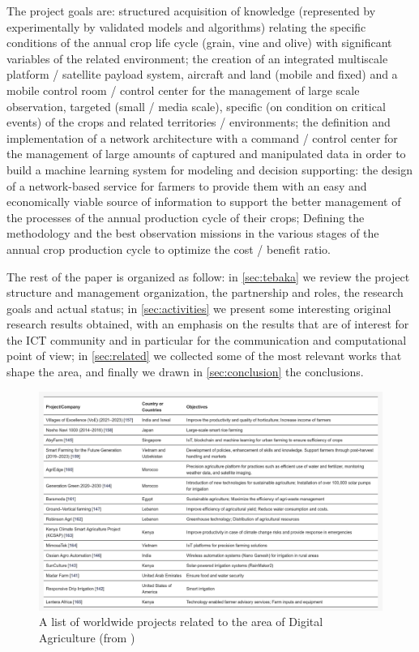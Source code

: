 \documentclass[a4paper, comsoc]{IEEEtran}
\begin{document}
The project goals are: structured acquisition of knowledge (represented by experimentally by validated models and algorithms) relating the specific conditions of the annual crop life cycle (grain, vine and olive) with significant variables of the related environment;
the creation of an integrated multiscale platform / satellite payload system, aircraft and land (mobile and fixed) and a mobile control room / control center for the management of large scale observation, targeted (small / media scale), specific (on condition on critical events) of the crops and related territories / environments; the definition and implementation of a network architecture with a command / control center for the management of large amounts of captured and manipulated data in order to build a machine learning system for modeling and decision supporting: the design of a network-based service for farmers to provide them with an easy and economically viable source of information to support the better management of the processes of the annual production cycle of their crops; Defining the methodology and the best observation missions in the various stages of the annual crop production cycle to optimize the cost / benefit ratio.

The rest of the paper is organized as follow: in \ref{sec:tebaka} we review the project structure and management organization, the partnership and roles, the research goals and actual status; in \ref{sec:activities} we present some interesting original research results obtained, with an emphasis on the results that are of interest for the ICT community and in particular for the communication and computational point of view; in \ref{sec:related} we collected some of the most relevant works that shape the area, and finally we drawn in \ref{sec:conclusion} the conclusions.

\begin{figure}
    \centering
    \includegraphics[width=\columnwidth]{research-table}
    \caption{A list of worldwide projects related to the area of Digital Agriculture (from \cite{agriengineering4020029})}
    \label{fig:table-worldwide}
\end{figure}
\end{document}
